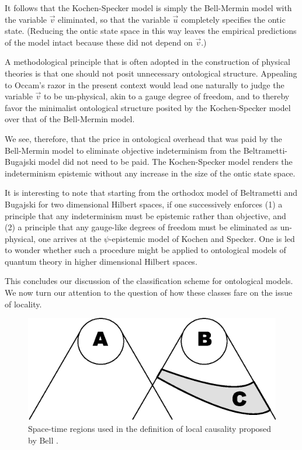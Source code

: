 \documentclass[aps,nofootinbib,12pt]{revtex4-2}
\begin{document}
It follows that the Kochen-Specker model is simply the Bell-Mermin
model with the variable $\vec{v}$ eliminated, so that the variable
$\vec{u}$ completely specifies the ontic state. (Reducing the ontic
state space in this way leaves the empirical predictions of the
model intact because these did not depend on $\vec{v}$.)

A methodological principle that is often adopted in the construction
of physical theories is that one should not posit unnecessary
ontological structure. Appealing to Occam's razor in the present
context would lead one naturally to judge the variable $\vec{v}$ to
be un-physical, akin to a gauge degree of freedom, and to thereby
favor the minimalist ontological structure posited by the
Kochen-Specker model over that of the Bell-Mermin model.

We see, therefore, that the price in ontological overhead that was
paid by the Bell-Mermin model to eliminate objective indeterminism
from the Beltrametti-Bugajski model did not need to be paid. The
Kochen-Specker model renders the indeterminism epistemic without any
increase in the size of the ontic state space.

It is interesting to note that starting from the orthodox model of
Beltrametti and Bugajski for two dimensional Hilbert spaces, if one
successively enforces (1) a principle that any indeterminism must be
epistemic rather than objective, and (2) a principle that any
gauge-like degrees of freedom must be eliminated as un-physical, one
arrives at the $\psi$-epistemic model of Kochen and Specker. One is
led to wonder whether such a procedure might be applied to
ontological models of quantum theory in higher dimensional Hilbert
spaces.

This concludes our discussion of the classification scheme for
ontological models. We now turn our attention to the question of how
these classes fare on the issue of locality.


\begin{figure}[t]
\includegraphics[scale=0.6]{bell_fig}\caption{Space-time regions used in the definition of local causality proposed by Bell \cite{Bell_cuisine}.}
\label{FIG:bell_fig}
\end{figure}
\end{document}
